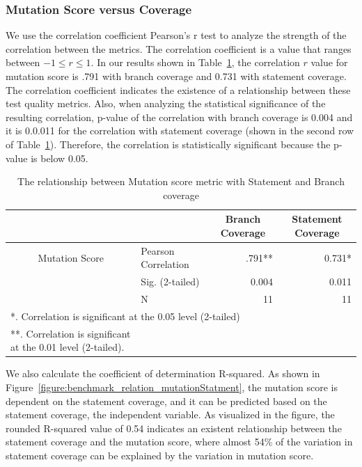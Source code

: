 \documentclass[conference]{IEEEtran}
\begin{document}
\subsubsection {Mutation Score versus Coverage}
We use the correlation coefficient Pearson's r test to analyze the strength of the correlation between the metrics. The correlation coefficient is a value that ranges between $-1 \leq r \leq 1$. In our results shown in Table~\ref{table:benchmark_relation_mutationScoreWithBranch}, the correlation $r$ value for mutation score is .791 with branch coverage and 0.731 with statement coverage. The correlation coefficient indicates the existence of a relationship between these test quality metrics. Also, when analyzing the statistical significance of the resulting correlation, p-value of the correlation with branch coverage is 0.004 and it is 0.0.011 for the correlation with statement coverage (shown in the second row of Table~\ref{table:benchmark_relation_mutationScoreWithBranch}). Therefore, the correlation is statistically significant because the p-value is below 0.05. %

\begin{table}[t!]
\caption{The relationship between Mutation score metric with Statement and Branch coverage}
\label{table:benchmark_relation_mutationScoreWithBranch}
\centering
\begin{tabular}{|l l|r|r|}
\hline
 &  & \multicolumn{1}{c|}{Branch Coverage} & \multicolumn{1}{c|}{Statement Coverage} \\ \hline
\multicolumn{ 1}{|c}{Mutation Score} & Pearson Correlation & .791** & 0.731* \\
\multicolumn{ 1}{|l}{} & Sig. (2-tailed) & 0.004 & 0.011 \\
\multicolumn{ 1}{|l}{} & N & 11 & 11 \\ \hline
\multicolumn{ 4}{|l|}{*. Correlation is significant at the 0.05 level (2-tailed)}\\
**. Correlation is significant at the 0.01 level (2-tailed). \\ \hline
\end{tabular}
\end{table}


We also calculate the coefficient of determination R-squared. As shown in Figure~\ref{figure:benchmark_relation_mutationStatment}, the mutation score is dependent on the statement coverage, and it can be predicted based on the statement coverage, the independent variable. As visualized in the figure, the rounded R-squared value of 0.54 indicates an existent relationship between the statement coverage and the mutation score, where almost 54\% of the variation in statement coverage can be explained by the variation in mutation score.
\end{document}
